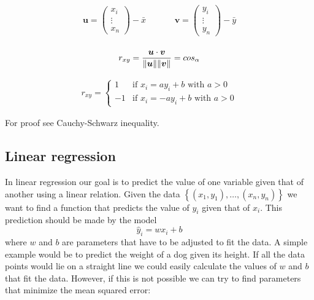   
\begin{align}
      \bm{u} = 
        \begin{pmatrix}
      x_{i} \\
      \vdots \\
      x_{n}
        \end{pmatrix}
        -\bar{x}
        \hspace{40pt}
      \bm{v} =  
        \begin{pmatrix}
      y_{i} \\
      \vdots \\
      y_{n}
        \end{pmatrix}
        -\bar{y}\\
\end{align}
  
\begin{equation*}
r_{xy} = \frac{\bm{u} \cdot \bm{v}}{\norm{\bm{u}}\norm{\bm{v}}} = cos_{\alpha}
\end{equation*}

    
\begin{align}
  r_{xy} =
    \begin{cases}
      1  & \text{if $x_{i}= ay_{i}+b$ with $a>0$} \\
      -1 & \text{if $x_{i}= -ay_{i}+b$ with $a>0$}
    \end{cases}       
\end{align}
    
For proof see Cauchy-Schwarz inequality.
    
\subsection {Linear regression}
In linear regression our goal is to predict the value 
of one variable given that of another using a linear relation.
Given the data $\left\{(x_{1},y_{1}),\ldots, (x_{n},y_{n})\right\}$
we want to find a function that predicts the value of $y_i$ given that of $x_i$.
This prediction should be made by the model
\begin{equation*}
  \hat{y}_i = wx_i+b
\end{equation*}
where $w$ and $b$ are parameters that have to be adjusted to fit the data.
A simple example would be to predict the weight of a dog given its height.
If all the data points would lie on a straight line we could easily calculate the values
of $w$ and $b$ that fit the data.
However, if this is not possible we can try to find parameters that 
minimize the mean squared error:

